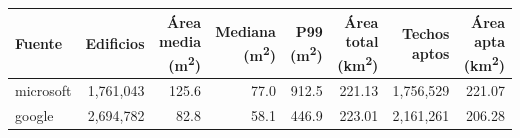 \begin{tabular}{lrrrrrrr}
\toprule
Fuente & Edificios & Área media (m\textsuperscript{2}) & Mediana (m\textsuperscript{2}) & P99 (m\textsuperscript{2}) & Área total (km\textsuperscript{2}) & Techos aptos & Área apta (km\textsuperscript{2}) \\
\midrule
microsoft & 1,761,043 & 125.6 & 77.0 & 912.5 & 221.13 & 1,756,529 & 221.07 \\
google & 2,694,782 & 82.8 & 58.1 & 446.9 & 223.01 & 2,161,261 & 206.28 \\
\bottomrule
\end{tabular}
